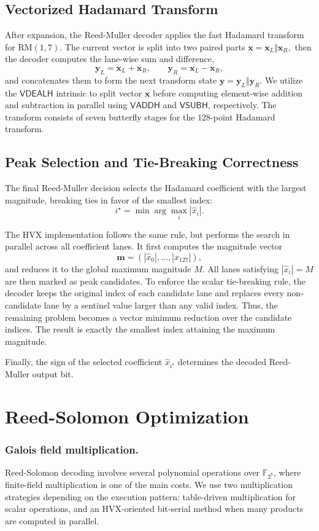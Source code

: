 \documentclass[12pt,a4paper]{report}
\begin{document}
\subsection{Vectorized Hadamard Transform}
After expansion, the Reed-Muller decoder applies the fast Hadamard transform
for \(\mathrm{RM}(1,7)\). The current vector is split into two
paired parts
$
    \mathbf{x} = \mathbf{x}_{L} \Vert \mathbf{x}_{R},
$
 then the decoder computes the lane-wise sum and difference,
\[
    \mathbf{y}_{L} = \mathbf{x}_{L} + \mathbf{x}_{R},
    \qquad
    \mathbf{y}_{R} = \mathbf{x}_{L} - \mathbf{x}_{R},
\]
and concatenates them to form the next transform state
$
    \mathbf{y} = \mathbf{y}_{L} \Vert \mathbf{y}_{R}
$.
We utilize the $\mathsf{VDEALH}$ intrinsic to split vector $\mathbf{x}$ before computing element-wise addition and subtraction in parallel using $\mathsf{VADDH}$ and $\mathsf{VSUBH}$, respectively. The transform consists of seven butterfly stages for the $128$-point Hadamard
transform.

\subsection{Peak Selection and Tie-Breaking Correctness}
The final Reed-Muller decision selects the Hadamard coefficient with the largest
magnitude, breaking ties in favor of the smallest index:
\[
    i^\star = \min\arg\max_i |\hat{x}_i|.
\]

The HVX implementation follows the same rule, but performs the search in
parallel across all coefficient lanes. It first computes the magnitude vector
\[
    \mathbf m = (|\hat{x}_0|,\ldots,|\hat{x}_{127}|),
\]
and reduces it to the global maximum magnitude \(M\). All lanes satisfying
\(|\hat{x}_i|=M\) are then marked as peak candidates. To enforce the scalar
tie-breaking rule, the decoder keeps the original index of each candidate lane
and replaces every non-candidate lane by a sentinel value larger than any valid
index. Thus, the remaining problem becomes a vector minimum reduction over the
candidate indices. The result is exactly the smallest index attaining the
maximum magnitude.

Finally, the sign of the selected coefficient \(\hat{x}_{i^\star}\) determines the decoded Reed-Muller output bit.

\section{Reed-Solomon Optimization}
\subsubsection{Galois field multiplication.} Reed-Solomon decoding involves several polynomial operations over
\(\mathbb F_{2^8}\), where finite-field multiplication is one of the main costs. We use two multiplication strategies depending on the execution pattern:
table-driven multiplication for scalar operations, and an HVX-oriented bit-serial method when many products are computed in parallel.
\end{document}
